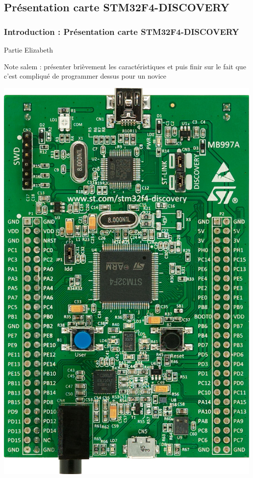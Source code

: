 \documentclass{beamer}
\begin{document}
\subsection{Présentation carte STM32F4-DISCOVERY}
\begin{frame}
\frametitle{Introduction : Présentation carte STM32F4-DISCOVERY}
Partie Elizabeth

Note salem : présenter brièvement les caractéristiques et puis finir sur le fait que
c'est compliqué de programmer dessus pour un novice
\begin{center}
 \includegraphics[scale=0.1]{../images/stm32f4_discovery.jpg}
\end{center}
\end{frame}
\end{document}
